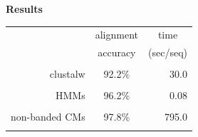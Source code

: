 \documentclass[landscape]{slides}
\begin{document}
%
\begin{slide}
\begin{center}
\large
\textbf{Results}
\end{center}
\medskip
\medskip
\begin{center}

\begin{tabular}{rcr} 
& \multicolumn{1}{c}{alignment} & \multicolumn{1}{c}{time} \\
& \multicolumn{1}{c}{accuracy} & \multicolumn{1}{c}{(sec/seq)} \\ \hline
& \multicolumn{1}{c}{} & \multicolumn{1}{c}{} \\
clustalw & 92.2\% & 30.0 \\ 
& \multicolumn{1}{c}{} & \multicolumn{1}{c}{} \\
HMMs & 96.2\% & 0.08 \\ 
& \multicolumn{1}{c}{} & \multicolumn{1}{c}{} \\
non-banded CMs & 97.8\% & 795.0 \\ 
& \multicolumn{1}{c}{} & \multicolumn{1}{c}{} \\
\end{tabular}
\end{center}

\vfill
\end{slide}
\end{document}
